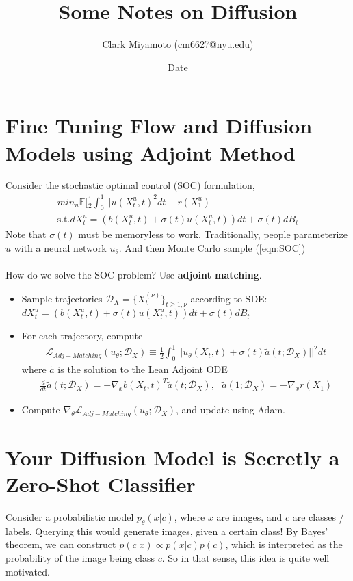 \documentclass[12pt,fleqn]{article}
\title{Some Notes on Diffusion}
\author{Clark Miyamoto (cm6627@nyu.edu)}
\date{Date}
\numberwithin{equation}{section} %
\begin{document}
\maketitle

\section{Fine Tuning Flow and Diffusion Models using Adjoint Method}
Consider the stochastic optimal control (SOC) formulation,
\begin{align}
	min_u \mathbb E [ \frac{1}{2} \int_0^1 || u(X_t^u, t)^2 dt - r(X_1^u) \label{eqn:SOC}\\
	\text{s.t.} dX_t^u = (b(X_t^u, t) + \sigma(t) u(X_t^u, t)) dt + \sigma(t) dB_t
\end{align}
Note that $\sigma(t)$ must be memoryless to work. Traditionally, people parameterize $u$ with a neural network $u_\theta$. And then Monte Carlo sample (\ref{eqn:SOC})
\\
\\
How do we solve the SOC problem? Use \textbf{adjoint matching}.
\begin{itemize}
	\item Sample trajectories $\mathcal D_X = \{X_t^{(\nu)}\}_{t\geq 1, \nu}$ according to SDE: $dX_t^u = (b(X_t^u, t) + \sigma(t) u(X_t^u, t)) dt + \sigma(t) dB_t$
	\item For each trajectory, compute
	\begin{align}
		\mathcal L_{Adj-Matching}(u_\theta; \mathcal D_X) \equiv \frac{1}{2} \int_0^1 || u_\theta(X_t, t) + \sigma(t) \tilde a(t; \mathcal D_X)||^2 dt
	\end{align}
	where $\tilde a$ is the solution to the Lean Adjoint ODE
	\begin{align}
		\frac{d}{dt} \tilde a(t; \mathcal D_X) = - \nabla_x b(X_t, t)^T \tilde a(t; \mathcal D_X), ~~~ \tilde a (1; \mathcal D_X) = - \nabla_x r(X_1)
	\end{align}
	\item Compute $\nabla_\theta \mathcal L_{Adj-Matching} (u_\theta; \mathcal D_X)$, and update using Adam.
\end{itemize}


\section{Your Diffusion Model is Secretly a Zero-Shot Classifier}
Consider a probabilistic model $p_\theta(x | c)$, where $x$ are images, and $c$ are classes / labels. Querying this would generate images, given a certain class! By Bayes' theorem, we can construct $p(c | x) \propto p(x | c) p(c)$, which is interpreted as the probability of the image being class $c$. So in that sense, this idea is quite well motivated.
\end{document}
